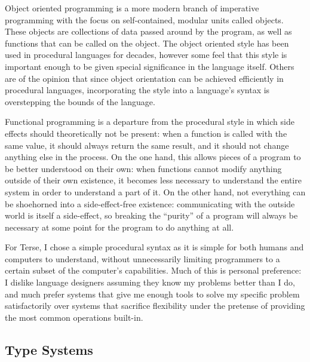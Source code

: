 \documentclass[12pt]{article}
\begin{document}
Object oriented programming is a more modern branch of imperative
programming with the focus on self-contained, modular units called
objects. These objects are collections of data passed around by the
program, as well as functions that can be called on the object. The
object oriented style has been used in procedural languages for
decades, however some feel that this style is important enough to be
given special significance in the language itself. Others are of the
opinion that since object orientation can be achieved efficiently in
procedural languages, incorporating the style into a language's syntax
is overstepping the bounds of the language.

Functional programming is a departure from the procedural style in
which side effects should theoretically not be present: when a
function is called with the same value, it should always return the
same result, and it should not change anything else in the process. On
the one hand, this allows pieces of a program to be better understood
on their own: when functions cannot modify anything outside of their
own existence, it becomes less necessary to understand the entire
system in order to understand a part of it. On the other hand, not
everything can be shoehorned into a side-effect-free existence:
communicating with the outside world is itself a side-effect, so
breaking the ``purity'' of a program will always be necessary at some
point for the program to do anything at all.

For Terse, I chose a simple procedural syntax as it is simple for both
humans and computers to understand, without unnecessarily limiting
programmers to a certain subset of the computer's capabilities. Much
of this is personal preference: I dislike language designers assuming
they know my problems better than I do, and much prefer systems that
give me enough tools to solve my specific problem satisfactorily over
systems that sacrifice flexibility under the pretense of providing the
most common operations built-in.

\subsection{Type Systems}
\end{document}
